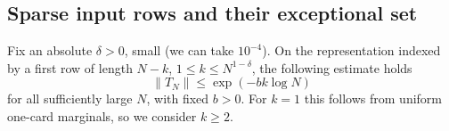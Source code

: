 \subsection{Sparse input rows and their exceptional set}
\begin{lemma}\label{tra:regular-ranks:sparse}
\label{tra:regular-ranks:sparse-statement}
Fix an absolute \(\delta>0\), small (we can take \(10^{-4}\)). On the representation indexed by a first row of length \(N-k\), \(1\le k\le N^{1-\delta}\), the following estimate holds
\begin{equation}
                          \|T_N\|\le \exp(-b k\log N)\label{tra:regular-ranks:eq2}
\end{equation}
for all sufficiently large \(N\), with fixed \(b>0\). For \(k=1\) this follows from uniform one-card marginals, so we consider \(k\ge2\).
\end{lemma}

